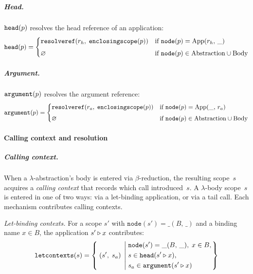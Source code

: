 \subparagraph{Head.}
$\mathtt{head}(p)$ resolves the head reference of an application:
\begin{equation}\label{eq:lambda-head}
  \mathtt{head}(p) =
  \begin{cases}
    \mathtt{resolveref}(r_h,\; \mathtt{enclosingscope}(p))
    & \text{if } \mathtt{node}(p) = \mathrm{App}(r_h,\, \_) \\[4pt]
    \varnothing
    & \text{if } \mathtt{node}(p) \in
      \mathrm{Abstraction} \cup \mathrm{Body}
  \end{cases}
\end{equation}

\subparagraph{Argument.}
$\mathtt{argument}(p)$ resolves the argument reference:
\begin{equation}\label{eq:lambda-argument}
  \mathtt{argument}(p) =
  \begin{cases}
    \mathtt{resolveref}(r_a,\; \mathtt{enclosingscope}(p))
    & \text{if } \mathtt{node}(p) = \mathrm{App}(\_,\, r_a) \\[4pt]
    \varnothing
    & \text{if } \mathtt{node}(p) \in
      \mathrm{Abstraction} \cup \mathrm{Body}
  \end{cases}
\end{equation}

\paragraph{Calling context and resolution}

\subparagraph{Calling context.}
When a $\lambda$-abstraction's body is entered via
$\beta$-reduction, the resulting scope~$s$ acquires a
\emph{calling context} that records which call
introduced~$s$.
A $\lambda$-body scope~$s$ is entered in one of two ways:
via a let-binding application, or via a tail call.
Each mechanism contributes calling contexts.

\emph{Let-binding contexts.}\;
For a scope $s'$ with $\mathtt{node}(s') = \_(B,\, \_)$
and a binding name $x \in B$, the application
$s' \mathbin{\triangleright} x$ contributes:
\begin{equation}\label{eq:lambda-let-contexts}
  \mathtt{letcontexts}(s) =
  \left\{\; (s',\; s_a) \;\left|\;
    \begin{aligned}
      &\mathtt{node}(s') = \_(B,\, \_),\;
      x \in B,\\
      &s \in \mathtt{head}(s' \mathbin{\triangleright} x),\\
      &s_a \in \mathtt{argument}(s' \mathbin{\triangleright} x)
    \end{aligned}
  \right.\right\}
\end{equation}

